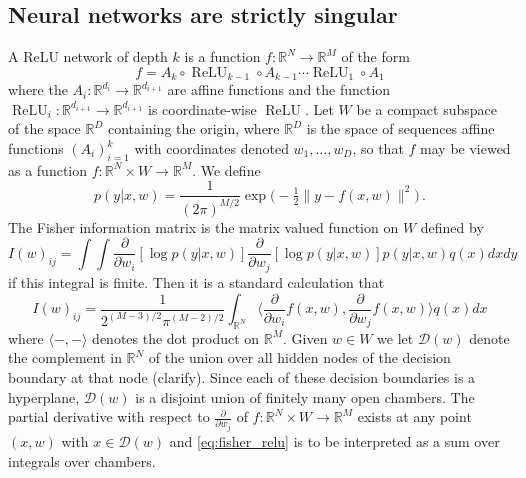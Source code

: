 \documentclass{article} %
\def\lto{\longrightarrow}
\begin{document}
\subsection{Neural networks are strictly singular}
\label{section:nn_singular}

A ReLU network of depth $k$ is a function $f: \mathbb{R}^N \lto \mathbb{R}^M$ of the form
\[
f = A_k \circ \operatorname{ReLU}_{k-1} \circ A_{k-1} \cdots \operatorname{ReLU}_1 \circ A_1
\]
where the $A_i: \mathbb{R}^{d_i} \lto \mathbb{R}^{d_{i+1}}$ are affine functions and the function $\operatorname{ReLU}_i: \mathbb{R}^{d_{i+1}} \lto \mathbb{R}^{d_{i+1}}$ is coordinate-wise $\operatorname{ReLU}$. Let $W$ be a compact subspace of the space $\mathbb{R}^D$ containing the origin, where $\mathbb{R}^D$ is the space of sequences affine functions $(A_i)_{i=1}^k$ with coordinates denoted $w_1,\ldots,w_D$, so that $f$ may be viewed as a function $f: \mathbb{R}^N \times W \lto \mathbb{R}^M$. We define
\[
p(y|x,w) = \frac{1}{(2 \pi)^{M/2}} \exp\Big(-\tfrac{1}{2} \| y - f(x,w) \|^2 \Big)\,.
\]
The Fisher information matrix is the matrix valued function on $W$ defined by
\[
I(w)_{ij} = \int\!\int \frac{\partial}{\partial w_i}[ \log p(y|x,w) ] \frac{\partial}{\partial w_j}[ \log p(y|x,w) ] p(y|x,w) q(x) dx dy
\]
if this integral is finite. Then it is a standard calculation that
\begin{equation}\label{eq:fisher_relu}
I(w)_{ij} = \frac{1}{2^{(M-3)/2} \pi^{(M-2)/2}} \int_{\mathbb{R}^N} \Big\langle \frac{\partial}{\partial w_i} f(x,w), \frac{\partial}{\partial w_j} f(x,w) \Big\rangle q(x) dx
\end{equation}
where $\langle -, - \rangle$ denotes the dot product on $\mathbb{R}^M$. Given $w \in W$ we let $\mathcal{D}(w)$ denote the complement in $\mathbb{R}^N$ of the union over all hidden nodes of the decision boundary at that node (clarify). Since each of these decision boundaries is a hyperplane, $\mathcal{D}(w)$ is a disjoint union of finitely many open chambers. The partial derivative with respect to $\frac{\partial}{\partial w_j}$ of $f: \mathbb{R}^N \times W \lto \mathbb{R}^M$ exists at any point $(x,w)$ with $x \in \mathcal{D}(w)$ and \eqref{eq:fisher_relu} is to be interpreted as a sum over integrals over chambers.
\end{document}
